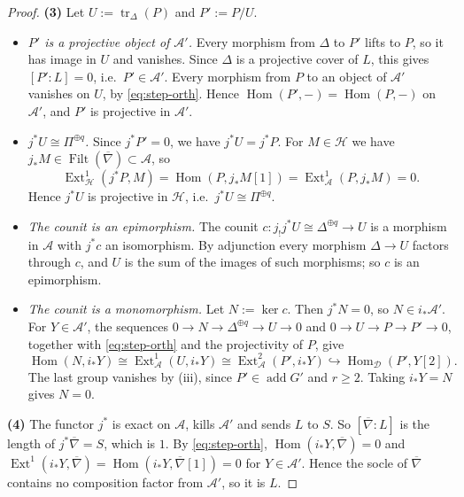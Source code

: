 \documentclass[11pt,reqno]{amsart}
\theoremstyle{plain}
\theoremstyle{definition}
\theoremstyle{remark}
\DeclareMathOperator{\Hom}{Hom}
\DeclareMathOperator{\Ext}{Ext}
\DeclareMathOperator{\Filt}{Filt}
\DeclareMathOperator{\add}{add}
\DeclareMathOperator{\tr}{tr}
\newcommand{\nablabar}{\overline{\nabla}}
\newcommand{\cD}{\mathcal{D}}
\newcommand{\cA}{\mathcal{A}}
\newcommand{\cH}{\mathcal{H}}
\begin{document}
\begin{proof}
\textbf{(3)} Let $U:=\tr_\Delta(P)$ and $P':=P/U$.
\begin{itemize}
\item \emph{$P'$ is a projective object of $\cA'$.} Every morphism from $\Delta$ to $P'$ lifts to $P$, so it has image in $U$ and vanishes. Since $\Delta$ is a projective cover of $L$, this gives $[P':L]=0$, i.e.\ $P'\in\cA'$. Every morphism from $P$ to an object of $\cA'$ vanishes on $U$, by \eqref{eq:step-orth}. Hence $\Hom(P',-)=\Hom(P,-)$ on $\cA'$, and $P'$ is projective in $\cA'$.
\item \emph{$j^*U\cong\Pi^{\oplus q}$.} Since $j^*P'=0$, we have $j^*U=j^*P$. For $M\in\cH$ we have $j_*M\in\Filt(\nablabar)\subset\cA$, so
\[\Ext^1_\cH(j^*P,M)=\Hom(P,j_*M[1])=\Ext^1_\cA(P,j_*M)=0.\]
Hence $j^*U$ is projective in $\cH$, i.e.\ $j^*U\cong\Pi^{\oplus q}$.
\item \emph{The counit is an epimorphism.} The counit $c\colon j_!j^*U\cong\Delta^{\oplus q}\to U$ is a morphism in $\cA$ with $j^*c$ an isomorphism. By adjunction every morphism $\Delta\to U$ factors through $c$, and $U$ is the sum of the images of such morphisms; so $c$ is an epimorphism.
\item \emph{The counit is a monomorphism.} Let $N:=\ker c$. Then $j^*N=0$, so $N\in i_*\cA'$. For $Y\in\cA'$, the sequences $0\to N\to\Delta^{\oplus q}\to U\to0$ and $0\to U\to P\to P'\to0$, together with \eqref{eq:step-orth} and the projectivity of $P$, give
\[\Hom(N,i_*Y)\cong\Ext^1_\cA(U,i_*Y)\cong\Ext^2_\cA(P',i_*Y)\hookrightarrow\Hom_\cD(P',Y[2]).\]
The last group vanishes by (iii), since $P'\in\add G'$ and $r\ge2$. Taking $i_*Y=N$ gives $N=0$.
\end{itemize}

\textbf{(4)} The functor $j^*$ is exact on $\cA$, kills $\cA'$ and sends $L$ to $S$. So $[\nablabar:L]$ is the length of $j^*\nablabar=S$, which is $1$. By \eqref{eq:step-orth}, $\Hom(i_*Y,\nablabar)=0$ and $\Ext^1(i_*Y,\nablabar)=\Hom(i_*Y,\nablabar[1])=0$ for $Y\in\cA'$. Hence the socle of $\nablabar$ contains no composition factor from $\cA'$, so it is $L$.
\end{proof}
\end{document}
